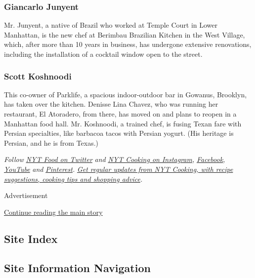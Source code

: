 \hypertarget{giancarlo-junyent-}{%
\subsubsection{Giancarlo Junyent }\label{giancarlo-junyent-}}

Mr. Junyent, a native of Brazil who worked at Temple Court in Lower
Manhattan, is the new chef at Berimbau Brazilian Kitchen in the West
Village, which, after more than 10 years in business, has undergone
extensive renovations, including the installation of a cocktail window
open to the street.

\hypertarget{scott-koshnoodi-}{%
\subsubsection{Scott Koshnoodi }\label{scott-koshnoodi-}}

This co-owner of Parklife, a spacious indoor-outdoor bar in Gowanus,
Brooklyn, has taken over the kitchen. Denisse Lina Chavez, who was
running her restaurant, El Atoradero, from there, has moved on and plans
to reopen in a Manhattan food hall. Mr. Koshnoodi, a trained chef, is
fusing Texan fare with Persian specialties, like barbacoa tacos with
Persian yogurt. (His heritage is Persian, and he is from Texas.)

\emph{Follow} \href{https://twitter.com/nytfood}{\emph{NYT Food on
Twitter}} \emph{and}
\href{https://www.instagram.com/nytcooking/}{\emph{NYT Cooking on
Instagram}}\emph{,}
\href{https://www.facebook.com/nytcooking/}{\emph{Facebook}}\emph{,}
\href{https://www.youtube.com/nytcooking}{\emph{YouTube}} \emph{and}
\href{https://www.pinterest.com/nytcooking/}{\emph{Pinterest}}\emph{.}
\href{https://www.nytimes.com/newsletters/cooking}{\emph{Get regular
updates from NYT Cooking, with recipe suggestions, cooking tips and
shopping advice}}\emph{.}

Advertisement

\protect\hyperlink{after-bottom}{Continue reading the main story}

\hypertarget{site-index}{%
\subsection{Site Index}\label{site-index}}

\hypertarget{site-information-navigation}{%
\subsection{Site Information
Navigation}\label{site-information-navigation}}

